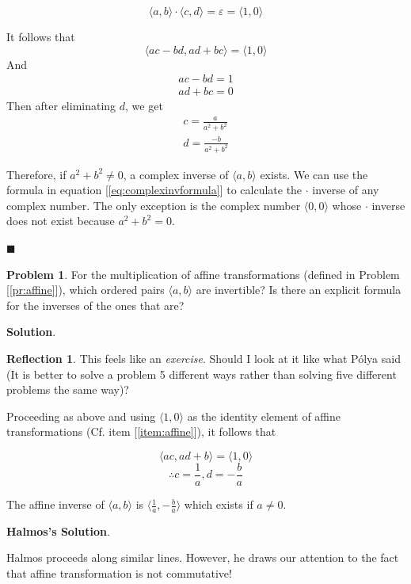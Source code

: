 \documentclass[english,notitlepage,smartquotes]{hgbreport}
\theoremstyle{definition}
\theoremstyle{definition}
\newtheorem{problem}{Problem}
\theoremstyle{remark}
\theoremstyle{definition}
\theoremstyle{plain}
\renewcommand\qedsymbol{$\blacksquare$}
\theoremstyle{definition}
\newtheorem{reflection}{Reflection}
\begin{document}
$$
\langle a,b\rangle\cdot\langle c,d\rangle=\varepsilon=\langle 1,0\rangle
$$

It follows that 
$$
\langle ac-bd,ad+bc\rangle=\langle1,0\rangle
$$
And
\begin{equation}
\!
\begin{aligned}
ac-bd=1 \\
ad+bc=0
\end{aligned}\label{eq:complexinv1}
\end{equation}
Then after eliminating $d$, we get
\begin{equation}
\!
\begin{aligned}
c=\frac{a}{a^2+b^2} \\
d=\frac{-b}{a^2+b^2}
\end{aligned}\label{eq:complexinvformula}
\end{equation}

Therefore, if ${a^2+b^2}\ne 0$, a complex inverse of $\langle a,b\rangle$ exists. We can use the formula in equation [\ref{eq:complexinvformula}] to calculate the $\cdot$ inverse of any complex number. The only exception is the complex number $\langle 0,0\rangle$ whose $\cdot$ inverse does not exist because $a^2+b^2=0$.

\qedsymbol

\begin{problem}
\label{pr:affineinv}
For the multiplication of affine transformations (defined in Problem [\ref{pr:affine}]), which ordered pairs $\langle a,b\rangle$ are invertible? Is there an explicit formula for the inverses of the ones that are?
\end{problem}

\textbf{Solution}.
\begin{reflection}
This feels like an \emph{exercise}. Should I look at it like what P\'{o}lya said (It is better to solve a problem 5 different ways rather than solving five different problems the same way)?
\end{reflection}
Proceeding as above and using $\langle 1,0\rangle$ as the identity element of affine transformations (Cf. item [\ref{item:affine}]), it follows that

$$
\langle ac,ad+b\rangle=\langle 1,0\rangle
$$
$$
\therefore c=\frac{1}{a}, d=-\frac{b}{a}
$$

The affine inverse of $\langle a,b\rangle$ is $\langle\frac{1}{a},-\frac{b}{a}\rangle$ which exists if $a\ne 0$.

\textbf{Halmos's Solution}.

Halmos proceeds along similar lines. However, he draws our attention to the fact that affine transformation is not commutative! 
\end{document}
